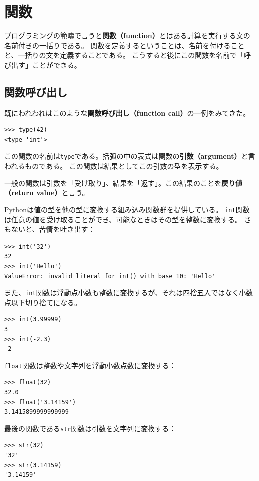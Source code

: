 \documentclass[a4j,12pt,makeidx]{jbook}
\begin{document}
{\chapter{関数\label{funcchap}}
プログラミングの範疇で言うと{\bf 関数（function）}とはある計算を実行する文の名前付きの一括りである。
関数を定義するということは、名前を付けることと、一括りの文を定義することである。
こうすると後にこの関数を名前で「呼び出す」ことができる。
%
\section{関数呼び出し}
既にわれわれはこのような{\bf 関数呼び出し（function call）}の一例をみてきた。
\begin{verbatim}
>>> type(42)
<type 'int'>
\end{verbatim}
この関数の名前は{\tt type}である。括弧の中の表式は関数の{\bf 引数（argument）}と言われるものである。
この関数は結果としてこの引数の型を表示する。\par
一般の関数は引数を「受け取り」、結果を「返す」。この結果のことを{\bf 戻り値（return value）}と言う。\par
Pythonは値の型を他の型に変換する組み込み関数群を提供している。
{\tt int}関数は任意の値を受け取ることができ、可能なときはその型を整数に変換する。
さもないと、苦情を吐き出す：
\begin{verbatim}
>>> int('32')
32
>>> int('Hello')
ValueError: invalid literal for int() with base 10: 'Hello'
\end{verbatim}
また、{\tt int}関数は浮動点小数も整数に変換するが、それは四捨五入ではなく小数点以下切り捨てになる。
\begin{verbatim}
>>> int(3.99999)
3
>>> int(-2.3)
-2
\end{verbatim}
{\tt float}関数は整数や文字列を浮動小数点数に変換する：
\begin{verbatim}
>>> float(32)
32.0
>>> float('3.14159')
3.1415899999999999
\end{verbatim}
最後の関数である{\tt str}関数は引数を文字列に変換する：
\begin{verbatim}
>>> str(32)
'32'
>>> str(3.14159)
'3.14159'
\end{verbatim}
%
}
\end{document}
